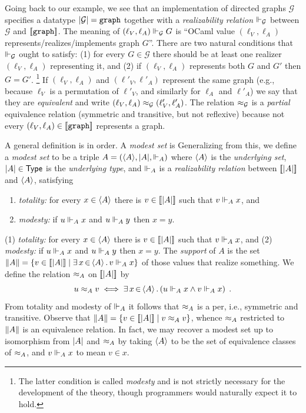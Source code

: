 Going back to our example, we see that an implementation of directed
graphs $\mathcal{G}$ specifies a datatype $|\mathcal{G}| =
\mathtt{graph}$ together with a \emph{realizability relation}
$\Vdash_{\mathcal{G}}$ between $\mathcal{G}$ and
$[\![\mathtt{graph}]\!]$. The meaning of $(\ell_V, \ell_A)
\Vdash_\mathcal{G} G$ is ``OCaml value $(\ell_V, \ell_A)$
represents/realizes/implements graph $G$''.
%
\iflong
%
There are two natural
conditions that $\Vdash_\mathcal{G}$ ought to satisfy: (1) for every $G
\in \mathcal{G}$ there should be at least one realizer $(\ell_V,
\ell_A)$ representing it, and (2) if $(\ell_V, \ell_A)$ represents
both $G$ and $G'$ then $G = G'$. \footnote{The latter condition is
  called \emph{modesty} and is not strictly necessary for the
  development of the theory, though programmers would naturally expect
  it to hold.} If $(\ell_V, \ell_A)$ and $(\ell'_V, \ell'_A)$
represent the same graph (e.g., because $\ell_V$ is a permutation of
$\ell'_V$, and similarly for $\ell_A$ and $\ell'_A$) we say that they
are \emph{equivalent} and write $(\ell_V, \ell_A) \approx_\mathcal{G}
(\ell'_V, \ell'_A)$. The relation $\approx_\mathcal{G}$ is a
\emph{partial} equivalence relation (symmetric and transitive, but not
reflexive) because not every $(\ell_V, \ell_A) \in
[\![\mathtt{graph}]\!]$ represents a graph.

\smallskip

A general definition is in order. A \emph{modest set} is 
%
\else %
%
Generalizing from this, we define a \emph{modest set} to be
%
a triple $A = (\langle A \rangle, |A|, {\Vdash_A})$ where $\langle A \rangle$ is
the \emph{underlying set}, $|A| \in \mathsf{Type}$ is the
\emph{underlying type}, and $\Vdash_A$ is a \emph{realizability relation}
between $[\![|A|]\!]$ and $\langle A \rangle$, satisfying
%
\iflong
% 
\begin{enumerate}
\item \emph{totality:} for every $x \in \langle A \rangle$ there is $v \in
  [\![|A|]\!]$ such that $v \Vdash_A x$, and
\item \emph{modesty:} if $u \Vdash_A x$ and $u \Vdash_A y$ then $x = y$.
\end{enumerate}
%
\else %
%
(1) \emph{totality:} for every $x \in \langle A \rangle$ there is $v \in
[\![|A|]\!]$ such that $v \Vdash_A x$, and (2) \emph{modesty:} if
$u \Vdash_A x$ and $u \Vdash_A y$ then $x = y$.
%
\fi %
%
The \emph{support} of $A$ is the set $\|A\| = \{v \in
  [\![|A|]\!] \mid \exists\, x \,{\in}\, \langle A \rangle\,.\,v \Vdash_A x\}$ of those
values that realize something. We define the relation $\approx_A$ on
$[\![|A|]\!]$ by
%
\begin{equation*}
  u \approx_A v
  \iff
  \exists\, x \,{\in}\, \langle A \rangle\,.\left(u \Vdash_A x \land v \Vdash_A x\right) \;.
\end{equation*}
%
From totality and modesty of $\Vdash_A$ it follows that $\approx_A$ is a per,
i.e., symmetric and transitive. Observe that $\|A\| = \{v \in
  [\![|A|]\!] \mid v \approx_A v\}$, whence $\approx_A$
restricted to $\|A\|$ is an equivalence relation. In fact, we
may recover a modest set up to isomorphism from $|A|$ and
$\approx_A$ by taking $\langle A \rangle$ to be the set of equivalence classes of
$\approx_A$, and $v \Vdash_A x$ to mean $v \in x$.


